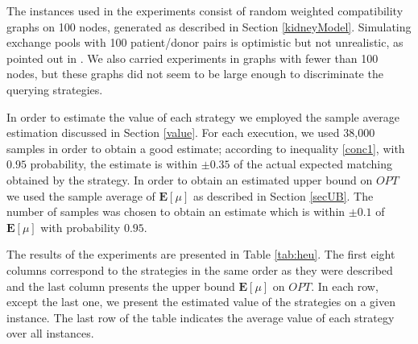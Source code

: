 \documentclass[12pt]{article}
\newcommand{\E}[1]{\mathbf{E}\left[#1\right]}
\begin{document}
		The instances used in the experiments consist of random weighted compatibility graphs on 100 nodes, generated as described in Section \ref{kidneyModel}. Simulating exchange pools with 100 patient/donor pairs is optimistic but not unrealistic, as pointed out in \cite{roth3}. We also carried experiments in graphs with fewer than 100 nodes, but these graphs did not seem to be large enough to discriminate the querying strategies. 
		
		In order to estimate the value of each strategy we employed the sample average estimation discussed in Section \ref{value}. For each execution, we used 38,000 samples in order to obtain a good estimate; according to inequality \eqref{conc1}, with $0.95$ probability, the estimate is within $\pm 0.35$ of the actual expected matching obtained by the strategy. In order to obtain an estimated upper bound on $OPT$ we used the sample average of $\E{\mu}$ as described in Section \ref{secUB}. The number of samples was chosen to obtain an estimate which is within $\pm 0.1$ of $\E{\mu}$ with probability $0.95$. 
		
		The results of the experiments are presented in Table \ref{tab:heu}. The first eight columns correspond to the strategies in the same order as they were described and the last column presents the upper bound $\E{\mu}$ on $OPT$. In each row, except the last one, we present the estimated value of the strategies on a given instance. The last row of the table indicates the average value of each strategy over all instances. 		
		
\end{document}
